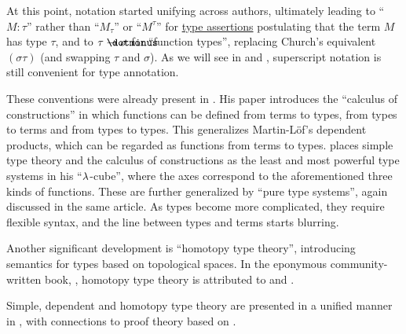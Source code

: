 \begin{remark}
  At this point, notation started unifying across authors, ultimately leading to \enquote{\( M: \tau \)} rather than \enquote{\( M_\tau \)} or \enquote{\( M^\tau \)} for \hyperref[def:type_assertion]{type assertions} postulating that the term \( M \) has type \( \tau \), and to \( \tau \synimplies \sigma \) for \enquote{function types}, replacing Church's equivalent \( (\sigma\tau) \) (and swapping \( \tau \) and \( \sigma \)). As we will see in  and , superscript notation is still convenient for type annotation.

  These conventions were already present in . His paper introduces the \enquote{calculus of constructions} in which functions can be defined from terms to types, from types to terms and from types to types. This generalizes Martin-L\"of's dependent products, which can be regarded as functions from terms to types.  places simple type theory and the calculus of constructions as the least and most powerful type systems in his \enquote{\( \mathrm{\lambda} \)-cube}, where the axes correspond to the aforementioned three kinds of functions. These are further generalized by \enquote{pure type systems}, again discussed in the same article. As types become more complicated, they require flexible syntax, and the line between types and terms starts blurring.

  Another significant development is \enquote{homotopy type theory}, introducing semantics for types based on topological spaces. In the eponymous community-written book, \cite{UnivalentProject2024OctoberHoTT}, homotopy type theory is attributed to \cite{Voevodski2006HoTT} and \cite{AwodeyWarren2009HoTT}.

  Simple, dependent and homotopy type theory are presented in a unified manner in \cite{Mimram2020ProgramEqualsProof}, with connections to proof theory based on .
\end{remark}

